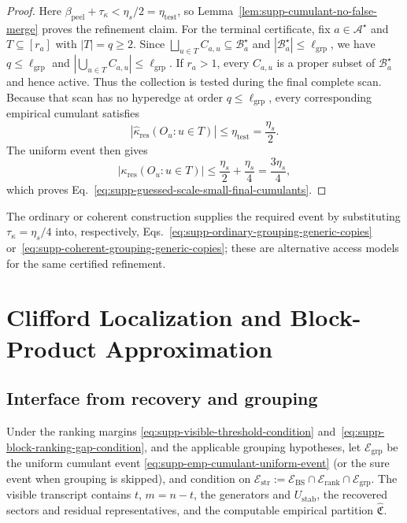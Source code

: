 \documentclass[
  aps,
  prx,
  reprint,
  superscriptaddress,
  amsmath,
  amssymb,
  nofootinbib,
  longbibliography
]{revtex4-2}
\begin{document}
\begin{proof}
Here
$\beta_{\mathrm{peel}}+\tau_\kappa<\eta_s/2=\eta_{\mathrm{test}}$, so
Lemma~\ref{lem:supp-cumulant-no-false-merge} proves the refinement claim.
For the terminal certificate, fix
$a\in\mathcal A^\star$ and $T\subseteq[r_a]$ with
$|T|=q\ge2$.  Since
$\bigsqcup_{u\in T}C_{a,u}\subseteq\mathcal B_a^\star$ and
$|\mathcal B_a^\star|\le\ell_{\mathrm{grp}}$, we have
$q\le\ell_{\mathrm{grp}}$ and
$|\bigcup_{u\in T}C_{a,u}|\le\ell_{\mathrm{grp}}$.  If $r_a>1$, every
$C_{a,u}$ is a proper subset of
$\mathcal B_a^\star$ and hence active.  Thus the collection is tested during the final
complete scan.  Because that scan has no hyperedge at order
$q\le\ell_{\mathrm{grp}}$, every corresponding empirical cumulant satisfies
\begin{equation}
\left|
\widehat\kappa_{\mathrm{res}}(O_u:u\in T)
\right|
\le
\eta_{\mathrm{test}}
=
\frac{\eta_s}{2}.
\end{equation}
The uniform event then gives
\begin{equation}
\left|
\kappa_{\mathrm{res}}(O_u:u\in T)
\right|
\le
\frac{\eta_s}{2}
+
\frac{\eta_s}{4}
=
\frac{3\eta_s}{4},
\end{equation}
which proves Eq.~\eqref{eq:supp-guessed-scale-small-final-cumulants}.
\end{proof}

The ordinary or coherent construction supplies the required event by
substituting $\tau_\kappa=\eta_s/4$ into, respectively,
Eqs.~\eqref{eq:supp-ordinary-grouping-generic-copies}
or~\eqref{eq:supp-coherent-grouping-generic-copies}; these are alternative
access models for the same certified refinement.



\section{Clifford Localization and Block-Product Approximation}
\label{sec:supp-block-normalization}

\subsection{Interface from recovery and grouping}
\label{sec:supp-localization-interface}

Under the ranking margins
\eqref{eq:supp-visible-threshold-condition}
and~\eqref{eq:supp-block-ranking-gap-condition}, and the applicable grouping
hypotheses, let $\mathcal E_{\mathrm{grp}}$ be the uniform cumulant event
\eqref{eq:supp-emp-cumulant-uniform-event} (or the sure event when grouping
is skipped), and condition on
$\mathcal E_{\mathrm{str}}:=\mathcal E_{\mathrm{BS}}\cap
\mathcal E_{\mathrm{rank}}\cap\mathcal E_{\mathrm{grp}}$.
The visible transcript contains $t$, $m=n-t$, the generators and
$U_{\mathrm{stab}}$, the recovered sectors and residual representatives,
and the computable empirical partition $\widehat{\mathfrak C}$.
\end{document}
